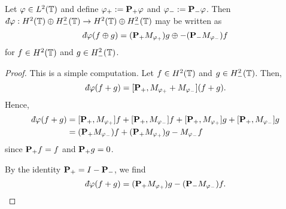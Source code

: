 \begin{lemma}
    Let $\varphi \in L^2(\mathbb{T})$ and define $\varphi_+ := \mathbf{P}_+ \varphi$ and $\varphi_- := \mathbf{P}_- \varphi$. Then $\qd\varphi:H^2(\Circ)\oplus H^2_-(\Circ)\rightarrow H^2(\Circ)\oplus H^2_-(\Circ)$ may be written as
    \begin{equation*}
        \qd\varphi(f\oplus g) = 
            (\Proj_+M_{\varphi_+})g \oplus
            -(\Proj_-M_{\varphi_-})f
    \end{equation*}
    for $f \in H^2(\mathbb{T})$ and $g \in H^2_-(\mathbb{T})$.
\end{lemma}
\begin{proof}
    This is a simple computation. Let $f \in H^2(\mathbb{T})$ and $g \in H^2_-(\mathbb{T})$. Then,
    \begin{equation*}
        \qd\varphi(f+g) = [\Proj_+,M_{\varphi_+}+M_{\varphi_-}](f+g).
    \end{equation*}
    Hence,
    \begin{align*}
        \qd\varphi(f+g) &= [\Proj_+,M_{\varphi_+}]f + [\Proj_+,M_{\varphi_-}]f + [\Proj_+,M_{\varphi_+}]g + [\Proj_+,M_{\varphi_-}]g\\
        &= (\Proj_+M_{\varphi_-})f+(\Proj_+M_{\varphi_+})g-M_{\varphi_-}f
    \end{align*}
    since $\mathbf{P}_+f = f$ and $\mathbf{P}_+g = 0$.
    
    By the identity $\mathbf{P}_+ = I-\mathbf{P}_-$, we find
    \begin{equation*}
        \qd\varphi(f+g) = (\Proj_+M_{\varphi_+})g - (\Proj_-M_{\varphi_-})f.
    \end{equation*}
\end{proof}

